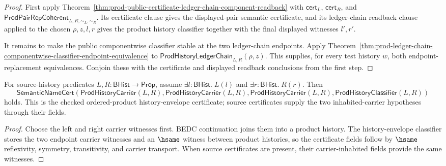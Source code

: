 \begin{proof}
First apply
Theorem~\ref{thm:prod-public-certificate-ledger-chain-component-readback} with
$\mathsf{cert}_L$, $\mathsf{cert}_R$, and
$\mathsf{ProdPairRepCoherent}_{L,R,\sim_L,\sim_R}$. Its certificate clause gives
the displayed-pair semantic certificate, and its ledger-chain readback clause
applied to the chosen $\rho,z,l,r$ gives the product history classifier together
with the final displayed witnesses $l',r'$.

It remains to make the public componentwise classifier stable at the two
ledger-chain endpoints. Apply
Theorem~\ref{thm:prod-ledger-chain-componentwise-classifier-endpoint-equivalence}
to $\mathsf{ProdHistoryLedgerChain}_{L,R}(\rho,z)$. This supplies, for every
test history $w$, both endpoint-replacement equivalences. Conjoin these with the
certificate and displayed readback conclusions from the first step.
\end{proof}

\begin{theorem}
\label{thm:concrete-prod-namecert}
For source-history predicates $L,R:\mathsf{BHist}\to\mathsf{Prop}$, assume
$\exists l:\mathsf{BHist}.\;L(l)$ and $\exists r:\mathsf{BHist}.\;R(r)$. Then
$$
\mathsf{SemanticNameCert}(\mathsf{ProdHistoryCarrier}(L,R),\mathsf{ProdHistoryCarrier}(L,R),\mathsf{ProdHistoryCarrier}(L,R),\mathsf{ProdHistoryClassifier}(L,R))
$$
holds. This is the checked ordered-product history-envelope certificate; source
certificates supply the two inhabited-carrier hypotheses through their fields.
\end{theorem}
\begin{proof}
Choose the left and right carrier witnesses first. BEDC continuation joins them
into a product history. The history-envelope classifier stores the two endpoint
carrier witnesses and an $\hsame$ witness between product histories, so the
certificate fields follow by $\hsame$ reflexivity, symmetry, transitivity, and
carrier transport. When source certificates are present, their carrier-inhabited
fields provide the same witnesses.
\end{proof}

